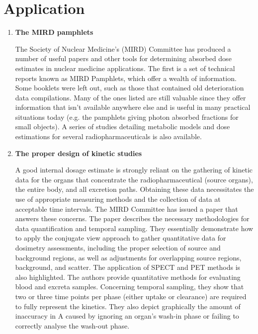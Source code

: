 \documentclass[12pt]{article}
\begin{document}
\section{Application}
\begin{enumerate}
\item \textbf{ The MIRD pamphlets} \par The Society of Nuclear Medicine's (MIRD) Committee has produced a number of useful papers and other tools for determining absorbed dose estimates in nuclear medicine applications. The first is a set of technical reports known as MIRD Pamphlets, which offer a wealth of information. Some booklets were left out, such as those that contained old deterioration data compilations. Many of the ones listed are still valuable since they offer information that isn't available anywhere else and is useful in many practical situations today (e.g. the pamphlets giving photon absorbed fractions for small objects). A series of studies detailing metabolic models and dose estimations for several radiopharmaceuticals is also available.

\item \textbf{ The proper design of kinetic studies} \par  A good internal dosage estimate is strongly reliant on the gathering of kinetic data for the organs that concentrate the radiopharmaceutical (source organs), the entire body, and all excretion paths. Obtaining these data necessitates the use of appropriate measuring methods and the collection of data at acceptable time intervals. The MIRD Committee has issued a paper that answers these concerns. The paper describes the necessary methodologies for data quantification and temporal sampling. They essentially demonstrate how to apply the conjugate view approach to gather quantitative data for dosimetry assessments, including the proper selection of source and background regions, as well as adjustments for overlapping source regions, background, and scatter. The application of SPECT and PET methods is also highlighted. The authors provide quantitative methods for evaluating blood and excreta samples. Concerning temporal sampling, they show that two or three time points per phase (either uptake or clearance) are required to fully represent the kinetics. They also depict graphically the amount of inaccuracy in A caused by ignoring an organ's wash-in phase or failing to correctly analyse the wash-out phase.


\end{enumerate}
\end{document}
